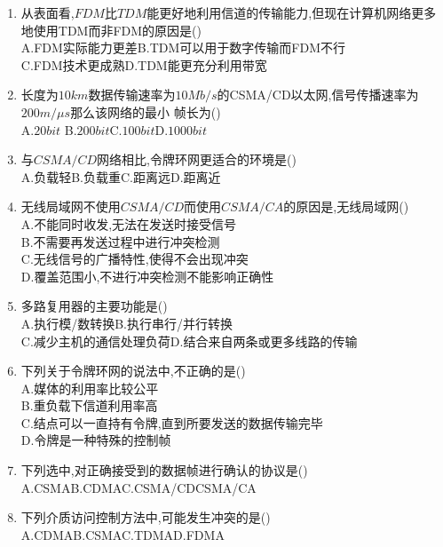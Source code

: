 \documentclass[12pt, a4paper, oneside, UTF8]{ctexbook}
\begin{document}
\begin{enumerate}
    \answer{
        \bs {

        }
    }
    \item 从表面看,$FDM$比$TDM$能更好地利用信道的传输能力,但现在计算机网络更多地使用TDM而非FDM的原因是() \\
    A.FDM实际能力更差\qquad B.TDM可以用于数字传输而FDM不行 \\
    C.FDM技术更成熟\qquad D.TDM能更充分利用带宽

    \item 长度为$10km$数据传输速率为$10Mb/s$的CSMA/CD以太网,信号传播速率为$200m/\mu s$那么该网络的最小
    帧长为() \\
    A.$20bit$ \qquad B.$200bit$\qquad C.$100bit$\qquad D.$1000bit$
    
    \item 与$CSMA/CD$网络相比,令牌环网更适合的环境是() \\
    A.负载轻\qquad B.负载重\qquad C.距离远\qquad D.距离近

    \item 无线局域网不使用$CSMA/CD$而使用$CSMA/CA$的原因是,无线局域网() \\
    A.不能同时收发,无法在发送时接受信号 \\
    B.不需要再发送过程中进行冲突检测 \\
    C.无线信号的广播特性,使得不会出现冲突 \\
    D.覆盖范围小,不进行冲突检测不能影响正确性 

    \item 多路复用器的主要功能是() \\
    A.执行模/数转换\qquad B.执行串行/并行转换 \\
    C.减少主机的通信处理负荷\qquad D.结合来自两条或更多线路的传输 

    \item 下列关于令牌环网的说法中,不正确的是() \\
    A.媒体的利用率比较公平 \\
    B.重负载下信道利用率高 \\
    C.结点可以一直持有令牌,直到所要发送的数据传输完毕 \\
    D.令牌是一种特殊的控制帧 
    
    \item \bt 下列选中,对正确接受到的数据帧进行确认的协议是()\\
    A.CSMA\qquad B.CDMA\qquad C.CSMA/CD\qquad CSMA/CA 

    \item \bt 下列介质访问控制方法中,可能发生冲突的是() \\
    A.CDMA\qquad B.CSMA\qquad C.TDMA\qquad D.FDMA


\end{enumerate}
\end{document}
